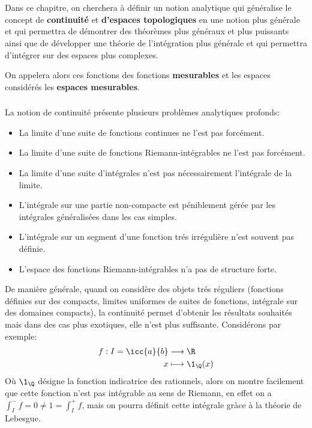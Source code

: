 \chapter*{} %
Dans ce chapitre, on cherchera à définir un notion analytique qui généralise le concept de \textbf{continuité} et \textbf{d'espaces topologiques} en une notion plus générale et qui permettra de démontrer des théorèmes plus généraux et plus puissants ainsi que de développer une théorie de l'intégration plus générale et qui permettra d'intégrer sur des espaces plus complexes.\<

On appelera alors ces fonctions des fonctions \textbf{mesurables} et les espaces considérés les \textbf{espaces mesurables}.

\subsection*{}
La notion de continuité présente plusieurs problèmes analytiques profonds:
\begin{itemize}
   \item La limite d'une suite de fonctions continues ne l'est pas forcément.
   \item La limite d'une suite de fonctions Riemann-intégrables ne l'est pas forcément.
   \item La limite d'une suite d'intégrales n'est pas nécessairement l'intégrale de la limite.
   \item L'intégrale sur une partie non-compacte est péniblement gérée par les intégrales généralisées dans les cas simples.
   \item L'intégrale sur un segment d'une fonction trés irrégulière n'est souvent pas définie.
   \item L'espace des fonctions Riemann-intégrables n'a pas de structure forte.
\end{itemize}
De manière générale, quand on considère des objets trés réguliers (fonctions définies sur des compacts, limites uniformes de suites de fonctions, intégrale sur des domaines compacts), la continuité permet d'obtenir les résultats souhaités mais dans des cas plus exotiques, elle n'est plus suffisante. Considérons par exemple:
\[
   \begin{aligned}
      f : I = \icc{a}{b} &\longrightarrow \R \\
      x &\longmapsto \1_\Q(x)
   \end{aligned}
\]
Où \(\1_\Q\) désigne la fonction indicatrice des rationnels, alors on montre facilement que cette fonction n'est pas intégrable au sens de Riemann, en effet on a \(\displaystyle\int_I^-{f} = 0 \neq 1 = \displaystyle\int_I^+{f}\), mais on pourra définit cette intégrale gràce à la théorie de Lebesgue.
